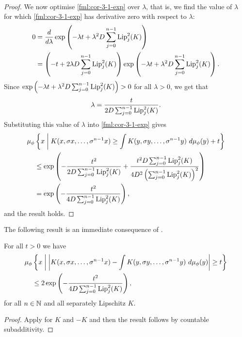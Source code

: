 \begin{corollary}
\begin{proof}
		We now optimise \eqref{fml:cor-3-1-exp} over $\lambda$, that is, we find the value of $\lambda$ for which \eqref{fml:cor-3-1-exp} has derivative zero with respect to $\lambda$:
		\begin{align*}
			0 &= \frac{d}{d\lambda} \exp\left(-\lambda t + \lambda^2 D \sum_{j = 0}^{n - 1}{\operatorname{Lip}_j^2(K)}\right) \\
				&= \left(-t + 2\lambda D \sum_{j = 0}^{n - 1}{\operatorname{Lip}_j^2(K)}\right) \exp\left(-\lambda t + \lambda^2 D \sum_{j = 0}^{n - 1}{\operatorname{Lip}_j^2(K)}\right).
		\end{align*}
		Since $\exp\left(-\lambda t + \lambda^2 D \sum_{j = 0}^{n - 1}{\operatorname{Lip}_j^2(K)}\right) > 0$ for all $\lambda > 0$, we get that
		\[
			\lambda = \frac{t}{2D \sum_{j = 0}^{n - 1}{\operatorname{Lip}_j^2(K)}}.
		\]
		Substituting this value of $\lambda$ into \eqref{fml:cor-3-1-exp} gives
		\begin{align*}
			\mu_\phi&\left\{x \midmid K(x, \sigma{x}, \dots, \sigma^{n - 1}{x}) \geq \int{K(y, \sigma{y}, \dots, \sigma^{n - 1}{y})\ d\mu_\phi(y)} + t\right\} \\
			 &\leq \exp\left(-\frac{t^2}{2D \sum_{j = 0}^{n - 1}{\Lip_j^2(K)}} + \frac{t^2 D \sum_{j = 0}^{n - 1}{\Lip_j^2(K)}}{4D^2 \left(\sum_{j = 0}^{n - 1}{\Lip_j^2(K)}\right)^2}\right) \\
			 &= \exp\left(-\frac{t^2}{4D\sum_{j = 0}^{n - 1}{\Lip_j^2(K)}}\right),
		\end{align*}
		and the result holds.
	\end{proof}
\end{corollary}

The following result is an immediate consequence of .

\begin{corollary}\label{cor:cm-3-1-5}
	For all $t > 0$ we have
	\begin{align}\label{fml:cm-4-5}
		\mu_\phi&\left\{x \midmid \left| K(x, \sigma{x}, \dots, \sigma^{n - 1}{x}) - \int{K(y, \sigma{y}, \dots, \sigma^{n - 1}{y})\ d\mu_\phi(y)} \right| \geq t\right\} \nonumber \\
		&\leq 2\exp\left(-\frac{t^2}{4D\sum_{j = 0}^{n - 1}{\Lip_j^2(K)}}\right),
	\end{align}
	for all $n \in \mathbb{N}$ and all separately Lipschitz $K$.
	\begin{proof}
		Apply  for $K$ and $-K$ and then the result follows by countable subadditivity.
	\end{proof}
\end{corollary}

